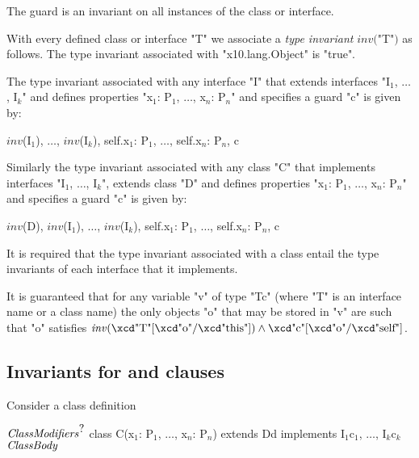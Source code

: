 \label{DepType:TypeInvariant}
\label{DepType:ClassGuardDef}

The guard is an invariant on all instances of the class or interface.

With every defined class or interface \xcd"T" we associate a {\em type
invariant} $\mathit{inv}($\xcd"T"$)$ as follows. The type
invariant associated with \xcd"x10.lang.Object" is 
\xcd"true".

The type invariant associated with any interface \xcd"I" that extends
interfaces \xcdmath"I$_1$, $\dots$, I$_k$" and defines properties
\xcdmath"x$_1$: P$_1$, $\dots$, x$_n$: P$_n$" and
specifies a guard \xcd"c" is given by:

\begin{xtenmath}
$\mathit{inv}$(I$_1$), $\dots$, $\mathit{inv}$(I$_k$),
    self.x$_1$: P$_1$,  $\dots$,  self.x$_n$: P$_n$, c  
\end{xtenmath}

Similarly the type invariant associated with any class \xcd"C" that
implements interfaces \xcdmath"I$_1$, $\dots$, I$_k$",
extends class \xcd"D" and defines properties
\xcdmath"x$_1$: P$_1$, $\dots$, x$_n$: P$_n$" and
specifies a guard \xcd"c" is
given by:
\begin{xtenmath}
$\mathit{inv}$(D), $\mathit{inv}$(I$_1$),  $\dots$, $\mathit{inv}$(I$_k$),
    self.x$_1$: P$_1$,  $\dots$, self.x$_n$: P$_n$,  c  
\end{xtenmath}

It is required that the type invariant associated with a class entail
the type invariants of each interface that it implements.

It is guaranteed that for any variable \xcd"v" of
type \xcd"T{c}" (where \xcd"T" is an interface name or a class name) the only
objects \xcd"o" that may be stored in \xcd"v" are such that \xcd"o" satisfies
$\mathit{inv}(\mbox{\xcd"T"}[\mbox{\xcd"o"}/\mbox{\xcd"this"}])
\wedge \mbox{\xcd"c"}[\mbox{\xcd"o"}/\mbox{\xcd"self"}]$.



\subsection{Invariants for  and  clauses}\label{DepType:Implements}
\label{DepType:Extends}
Consider a class definition
\begin{xtenmath}
$\mbox{\emph{ClassModifiers}}^{\mbox{?}}$
class C(x$_1$: P$_1$, $\dots$, x$_n$: P$_n$) extends D{d}
   implements I$_1${c$_1$}, $\dots$, I$_k${c$_k$}
$\mbox{\emph{ClassBody}}$
\end{xtenmath}

